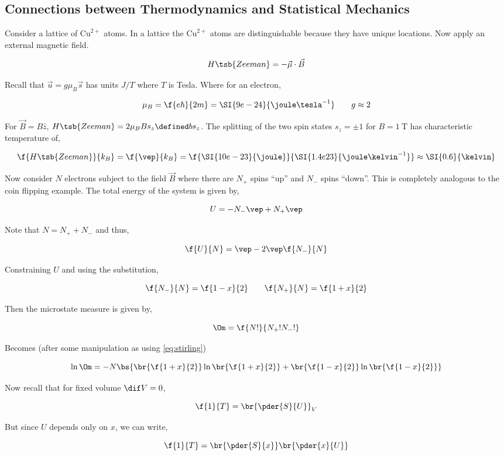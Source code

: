 \documentclass{article}
\begin{document}
\subsection{Connections between Thermodynamics and Statistical Mechanics}

Consider a lattice of $\text{Cu}^{2+}$ atoms. In a lattice the $\text{Cu}^{2+}$ atoms are distinguishable because they have unique locations. Now apply an external magnetic field.

\[ H\tsb{Zeeman} = - \vec{\mu} \cdot \vec{B} \]

Recall that $\vec{u} = g \mu_B \vec{s}$ has units $J/T$ where $T$ is Tesla. Where for an electron,

\[ \mu_B = \f{e\hbar}{2m} = \SI{9e-24}{\joule \tesla^{-1}} \qquad g \approx 2 \]

For $\vec{B} = B \hat{z}$, $H\tsb{Zeeman} = 2\mu_BBs_z \defined b s_z$. The splitting of the two spin states $s_z = \pm 1$ for $B = \SI{1}{\tesla}$ has characteristic temperature of,

\[ \f{H\tsb{Zeeman}}{k_B} = \f{\vep}{k_B} = \f{\SI{10e-23}{\joule}}{\SI{1.4e23}{\joule\kelvin^{-1}}} \approx \SI{0.6}{\kelvin} \]

Now consider $N$ electrons subject to the field $\vec{B}$ where there are $N_+$ spins ``up'' and $N_-$ spins ``down''. This is completely analogous to the coin flipping example. The total energy of the system is given by,

\[ U = - N_- \vep + N_+ \vep \]

Note that $N = N_+ + N_-$ and thus,

\[ \f{U}{N} = \vep - 2 \vep \f{N_-}{N} \]

Constraining $U$ and using the substitution,

\[ \f{N_-}{N} = \f{1-x}{2} \qquad \f{N_+}{N} = \f{1+x}{2}\]

Then the microstate measure is given by,

\[ \Om = \f{N!}{N_+!N_-!} \]

Becomes (after some manipulation as using \eqref{eq:stirling})

\[ \ln\Om = -N\bs{\br{\f{1+x}{2}}\ln\br{\f{1+x}{2}} + \br{\f{1-x}{2}}\ln\br{\f{1-x}{2}}} \]

Now recall that for fixed volume $\dif V = 0$,

\[ \f{1}{T} = \br{\pder{S}{U}}_V \]

But since $U$ depends only on $x$, we can write,

\[ \f{1}{T} = \br{\pder{S}{x}}\br{\pder{x}{U}} \]
\end{document}
